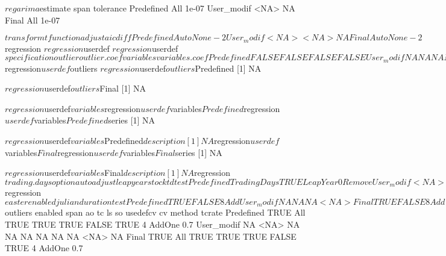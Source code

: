 \documentclass[article]{jss}
\begin{document}
\begin{CodeChunk}
\begin{CodeOutput}
$regarima
$estimate
           span tolerance
Predefined  All     1e-07
User_modif <NA>        NA
Final       All     1e-07

$transform
           tfunction adjust aicdiff
Predefined      Auto   None      -2
User_modif      <NA>   <NA>      NA
Final           Auto   None      -2

$regression
$regression$userdef
$regression$userdef$specification
           outlier outlier.coef variables variables.coef
Predefined   FALSE        FALSE     FALSE          FALSE
User_modif      NA           NA        NA             NA
Final        FALSE        FALSE     FALSE          FALSE

$regression$userdef$outliers
$regression$userdef$outliers$Predefined
[1] NA

$regression$userdef$outliers$Final
[1] NA


$regression$userdef$variables
$regression$userdef$variables$Predefined
$regression$userdef$variables$Predefined$series
[1] NA

$regression$userdef$variables$Predefined$description
[1] NA


$regression$userdef$variables$Final
$regression$userdef$variables$Final$series
[1] NA

$regression$userdef$variables$Final$description
[1] NA




$regression$trading.days
                option autoadjust leapyear stocktd   test
Predefined TradingDays       TRUE LeapYear       0 Remove
User_modif        <NA>         NA     <NA>      NA   <NA>
Final      TradingDays       TRUE LeapYear       0 Remove

$regression$easter
           enabled julian duration test
Predefined    TRUE  FALSE        8  Add
User_modif      NA     NA       NA <NA>
Final         TRUE  FALSE        8  Add


$outliers
           enabled span   ao   tc   ls    so usedefcv cv method tcrate
Predefined    TRUE  All TRUE TRUE TRUE FALSE     TRUE  4 AddOne    0.7
User_modif      NA <NA>   NA   NA   NA    NA       NA NA   <NA>     NA
Final         TRUE  All TRUE TRUE TRUE FALSE     TRUE  4 AddOne    0.7


\end{CodeOutput}
\end{CodeChunk}
\end{document}
